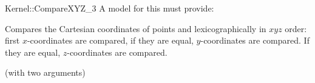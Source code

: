 \begin{ccRefFunctionObjectConcept}{Kernel::CompareXYZ_3}
A model for this must provide:


      {Compares the Cartesian coordinates of points  and
        lexicographically in $xyz$ order: first 
       $x$-coordinates are compared, if they are equal, $y$-coordinates
       are compared. If they are equal, $z$-coordinates are compared.}

\ccRefines
{} (with two arguments)

\ccSeeAlso
{} \\

\end{ccRefFunctionObjectConcept}
